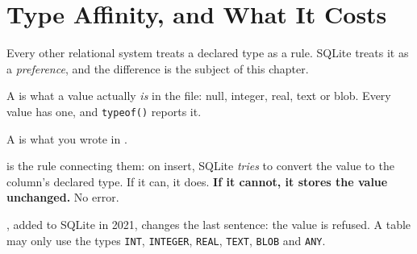 \section{Type Affinity, and What It Costs}

Every other relational system treats a declared type as a rule. SQLite treats
it as a \emph{preference}, and the difference is the subject of this chapter.

\begin{definitionbox}
A  is what a value actually \emph{is} in the file: null,
integer, real, text or blob. Every value has one, and \texttt{typeof()} reports
it.

\smallskip
A  is what you wrote in .

\smallskip
{} is the rule connecting them: on insert, SQLite
\emph{tries} to convert the value to the column's declared type. If it can, it
does. \textbf{If it cannot, it stores the value unchanged.} No error.

\smallskip
{}, added to SQLite in 2021, changes the last sentence: the value
is refused. A  table may only use the types \texttt{INT},
\texttt{INTEGER}, \texttt{REAL}, \texttt{TEXT}, \texttt{BLOB} and
\texttt{ANY}.
\end{definitionbox}

